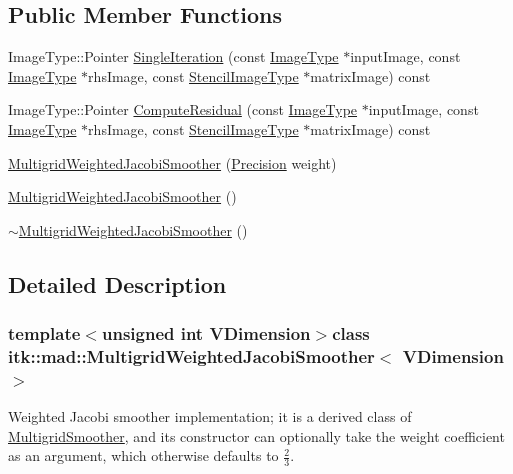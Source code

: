 \subsection*{Public Member Functions}
\begin{DoxyCompactItemize}
\item 
Image\-Type\-::\-Pointer \hyperlink{classitk_1_1mad_1_1_multigrid_weighted_jacobi_smoother_abff75c371a2ca2b85c1715df83eb2265}{Single\-Iteration} (const \hyperlink{class_image}{Image\-Type} $\ast$input\-Image, const \hyperlink{class_image}{Image\-Type} $\ast$rhs\-Image, const \hyperlink{classitk_1_1mad_1_1_stencil_image}{Stencil\-Image\-Type} $\ast$matrix\-Image) const 
\item 
Image\-Type\-::\-Pointer \hyperlink{classitk_1_1mad_1_1_multigrid_weighted_jacobi_smoother_ac624a5ecbf37dc87a76709be747af2eb}{Compute\-Residual} (const \hyperlink{class_image}{Image\-Type} $\ast$input\-Image, const \hyperlink{class_image}{Image\-Type} $\ast$rhs\-Image, const \hyperlink{classitk_1_1mad_1_1_stencil_image}{Stencil\-Image\-Type} $\ast$matrix\-Image) const 
\item 
\hyperlink{classitk_1_1mad_1_1_multigrid_weighted_jacobi_smoother_a314c9b962da90a2a411c9e0c9bf0ed23}{Multigrid\-Weighted\-Jacobi\-Smoother} (\hyperlink{classitk_1_1mad_1_1_multigrid_smoother_a23c762f89a3b1509f0a64cfd42e82427}{Precision} weight)
\item 
\hyperlink{classitk_1_1mad_1_1_multigrid_weighted_jacobi_smoother_a8717f0172e8df6ac83f0eb4923672120}{Multigrid\-Weighted\-Jacobi\-Smoother} ()
\item 
\hyperlink{classitk_1_1mad_1_1_multigrid_weighted_jacobi_smoother_a25bbab372e709486120f71df0f4e9e6c}{$\sim$\-Multigrid\-Weighted\-Jacobi\-Smoother} ()
\end{DoxyCompactItemize}


\subsection{Detailed Description}
\subsubsection*{template$<$unsigned int V\-Dimension$>$class itk\-::mad\-::\-Multigrid\-Weighted\-Jacobi\-Smoother$<$ V\-Dimension $>$}

Weighted Jacobi smoother implementation; it is a derived class of \hyperlink{classitk_1_1mad_1_1_multigrid_smoother}{Multigrid\-Smoother}, and its constructor can optionally take the weight coefficient as an argument, which otherwise defaults to $ \frac{2}{3} $. 

